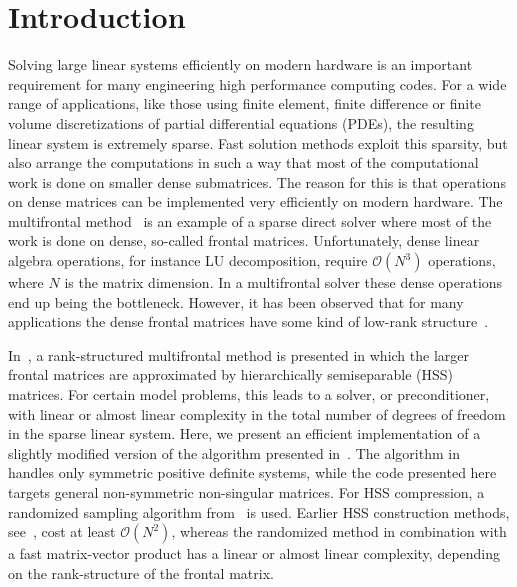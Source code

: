 \documentclass{article}
\newcommand{\ignore}[1]{}
\begin{document}
\section{Introduction}
Solving large linear systems efficiently on modern hardware is an
important requirement for many engineering high performance computing
codes.  For a wide range of applications, like those using finite
element, finite difference or finite volume discretizations of partial
differential equations (PDEs), the resulting linear system is
extremely sparse. Fast solution methods exploit this sparsity, but
also arrange the computations in such a way that most of the
computational work is done on smaller dense submatrices. The reason
for this is that operations on dense matrices can be implemented very
efficiently on modern hardware. The multifrontal
method~\cite{duff1983multifrontal,liu1992multifrontal} is an example
of a sparse direct solver where most of the work is done on dense,
so-called frontal matrices. Unfortunately, dense linear algebra
operations, for instance LU decomposition, require $\mathcal{O}(N^3)$
operations, where $N$ is the matrix dimension. In a multifrontal
solver these dense operations end up being the bottleneck. However, it
has been observed that for many applications the dense frontal
matrices have some kind of low-rank
structure~\cite{chandrasekaran2010numerical}.

In~\cite{xia2013randomized}, a rank-structured multifrontal method is
presented in which the larger frontal matrices are approximated by
hierarchically semiseparable (HSS)~\cite{vandebril2005bibliography}
matrices. For certain model problems, this leads to a solver, or
preconditioner, with linear or almost linear complexity in the total
number of degrees of freedom in the sparse linear system. Here, we
present an efficient implementation of a slightly modified version of
the algorithm presented in~\cite{xia2013randomized}. The algorithm
in~\cite{xia2013randomized} handles only symmetric positive definite
systems, while the code presented here targets general non-symmetric
non-singular matrices. For HSS compression, a randomized sampling
algorithm from~\cite{martinsson2011fast} is used. Earlier HSS
construction methods, see~\cite{xia2010fast}, cost at least
$\mathcal{O}(N^2)$, whereas the randomized method in combination with
a fast matrix-vector product has a linear or almost linear complexity,
depending on the rank-structure of the frontal matrix.
\ignore{
\todo[inline]{[FH] The sentence above is true only if you have a fast
matvec or in our special sparse context (the sample is assembled
from HSS matvecs), but not in general.
I feel like the intro has a couple sentences about complexity that
are confusing because they mix sparse and dense and don't have enough
context. I would leave only the following: MF=\(N^2\), MF-HSS+RS=\(N\)-ish
\textbf{for model problems}.}
}
\end{document}
